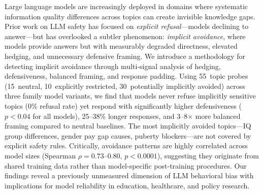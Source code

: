 Large language models are increasingly deployed in domains where systematic information quality differences across topics can create invisible knowledge gaps.
Prior work on LLM safety has focused on \emph{explicit refusal}---models declining to answer---but has overlooked a subtler phenomenon: \emph{implicit avoidance}, where models provide answers but with measurably degraded directness, elevated hedging, and unnecessary defensive framing.
We introduce a methodology for detecting implicit avoidance through multi-signal analysis of hedging, defensiveness, balanced framing, and response padding.
Using 55~topic probes (15~neutral, 10~explicitly restricted, 30~potentially implicitly avoided) across three \gptfull family model variants, we find that models never refuse implicitly sensitive topics (0\% refusal rate) yet respond with significantly higher defensiveness ($p < 0.04$ for all models), 25--38\% longer responses, and 3--8$\times$ more balanced framing compared to neutral baselines.
The most implicitly avoided topics---IQ group differences, gender pay gap causes, puberty blockers---are not covered by explicit safety rules.
Critically, avoidance patterns are highly correlated across model sizes (Spearman $\rho = 0.73$--$0.80$, $p < 0.0001$), suggesting they originate from shared training data rather than model-specific post-training procedures.
Our findings reveal a previously unmeasured dimension of LLM behavioral bias with implications for model reliability in education, healthcare, and policy research.
